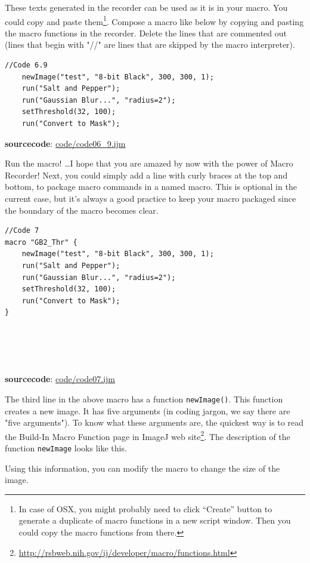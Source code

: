 \documentclass[11pt,a4paper,oneside]{report}
\newenvironment{indentCom}
{\begin{list}{}
         {\setlength{\leftmargin}{1em}}
         \item[]
}
{\end{list}}
\newcommand{\ilcom}[1]{\texttt{\small#1}}
\begin{document}
These texts generated in the recorder can be used as it is in your macro.  You could copy and paste them\footnote{In case of OSX, you might probably need to click ``Create'' button to generate a duplicate of macro functions in a new script window. Then you could copy the macro functions from there.}. Compose a macro like below by copying and pasting the macro functions in the recorder.  Delete the lines that are commented out (lines that begin with "//" are lines that are skipped by the macro interpreter).

\begin{lstlisting}
//Code 6.9
	newImage("test", "8-bit Black", 300, 300, 1);
	run("Salt and Pepper");
	run("Gaussian Blur...", "radius=2");
	setThreshold(32, 100);
	run("Convert to Mask");
\end{lstlisting}
\textbf{sourcecode}: \href{http://www.example.com/contents}{code/code06\_9.ijm}

Run the macro! \ldots I hope that you are amazed by now with the power of Macro
Recorder! Next, you could simply add a line with curly braces at the top and bottom, to package macro commands in a named macro. This is optional in the current case, but it's always a good practice to keep your macro packaged since the boundary of the macro becomes clear. 
 

\begin{lstlisting}
//Code 7
macro "GB2_Thr" {
	newImage("test", "8-bit Black", 300, 300, 1);
	run("Salt and Pepper");
	run("Gaussian Blur...", "radius=2");
	setThreshold(32, 100);
	run("Convert to Mask");
}





\end{lstlisting}
\textbf{sourcecode}: \href{http://www.example.com/contents}{code/code07.ijm}

The third line in the above macro has a function \ilcom{newImage()}. This
function creates a new image. It has five arguments (in coding jargon, we say
there are "five arguments"). To know what these arguments are, 
the quickest way is to read the Build-In Macro Function page in ImageJ web site\footnote{\url{http://rsbweb.nih.gov/ij/developer/macro/functions.html}}.  
The description of the function \ilcom{newImage} looks like this. 

\begin{indentCom}

\end{indentCom}
Using this information, you can modify the macro to change the size of the image.
\end{document}
